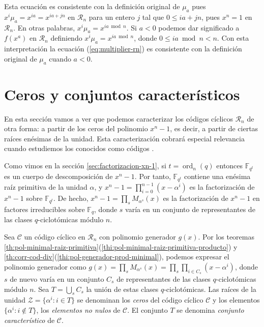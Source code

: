 Esta ecuación es consistente con la definición original de \(\mu_a\) pues \(x^i\mu_a = x^{ia} = x^{ia + jn}\) en \(\mathcal R_n\) para un entero \(j\) tal que \(0 \leq ia + jn\), pues \(x^n = 1\) en \(\mathcal R_n\).
En otras palabras, \(x^i\mu_a = x^{ia \bmod n}\).
Si \(a < 0\) podemos dar significado a \(f(x^a)\) en \(\mathcal R_n\) definiendo \(x^{i}\mu_a = x^{ia \bmod n}\), donde \(0 \leq ia \bmod n < n\).
Con esta interpretación la ecuación (\ref{eq:multiplier-rn}) es consistente con la definición original de \(\mu_a\) cuando \(a < 0\).

\section{Ceros y conjuntos característicos}

En esta sección vamos a ver que podemos caracterizar los códigos cíclicos \(\mathcal R_n\) de otra forma: a partir de los ceros del polinomio \(x^n - 1\), es decir, a partir de ciertas raíces enésimas de la unidad.
Esta caracterización cobrará especial relevancia cuando estudiemos los conocidos como códigos .

Como vimos en la sección \ref{sec:factorizacion-xn-1}, si \(t = \operatorname{ord}_n(q)\) entonces \(\mathbb F_{q^t}\) es un cuerpo de descomposición de \(x^n - 1\).
Por tanto, \(\mathbb F_{q^t}\) contiene una enésima raíz primitiva de la unidad \(\alpha\), y \(x^n - 1 = \prod_{i=0}^{n-1}(x - \alpha^{i})\) es la factorización de \(x^n - 1\) sobre \(\mathbb F_{q^t}\).
De hecho, \(x^n - 1 = \prod_s M_{\alpha^s}(x)\) es la factorización de \(x^n - 1\) en factores irreducibles sobre \(\mathbb F_q\), donde \(s\) varía en un conjunto de representantes de las clases \(q\)-ciclotómicas módulo \(n\).

Sea \(\mathcal C\) un código cíclico en \(\mathcal R_n\) con polinomio generador \(g(x)\).
Por los teoremas \ref{th:pol-minimal-raiz-primitiva}(\ref{thi:pol-minimal-raiz-primitiva-producto}) y \ref{th:corr-cod-div}(\ref{thi:pol-generador-prod-minimal}), podemos expresar el polinomio generador como \(g(x) = \prod_{s}M_{\alpha^s}(x) = \prod_s\prod_{i \in C_s}(x - \alpha^{i})\), donde \(s\) de nuevo varía en un conjunto \(C_s\) de representantes de las clases \(q\)-ciclotómicas módulo \(n\).
Sea \(T = \bigcup_s C_s\) la unión de estas clases \(q\)-ciclotómicas.
Las raíces de la unidad \(\mathcal Z = \{\alpha^{i} : i \in T\}\) se denominan los \textit{ceros} del código cíclico \(\mathcal C\) y los elementos \(\{\alpha^{i} : i \notin T\}\), los \textit{elementos no nulos} de \(\mathcal C\).
El conjunto \(T\) se denomina \textit{conjunto característico} de \(\mathcal C\).

